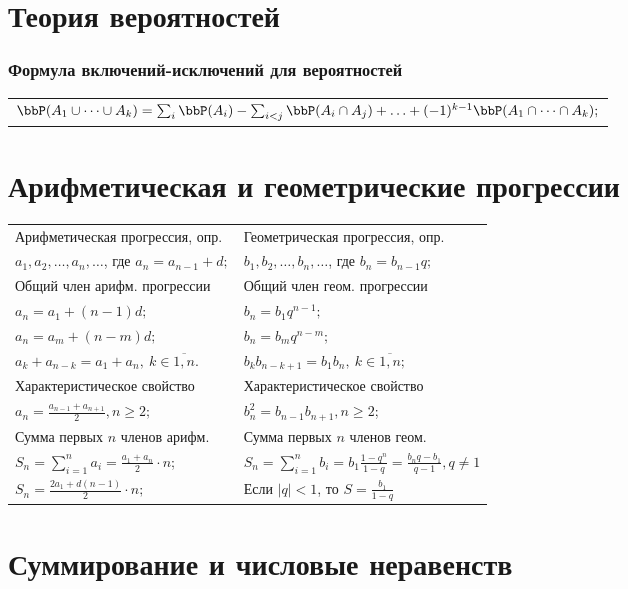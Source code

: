 \section{Теория вероятностей}

\subsubsection{Формула включений-исключений для вероятностей}

\begin{longtable}[l]{l}
	$\bbP(A_1\cup\dots\cup A_k)= \sum_{i} \bbP(A_i) - \sum_{i<j} \bbP(A_i\cap A_j)+\ldots + (-1)^{k-1}\bbP(A_1\cap\dots\cap A_k);$
\end{longtable}

\section{Арифметическая и геометрические прогрессии}
\begin{longtable}[l]{l l}
{\subsubfont Арифметическая прогрессия, опр.}
&
{\subsubfont Геометрическая прогрессия, опр.}
\\
{$a_1,a_2,\ldots,a_n,\dots$, где $a_{n}=a_{n-1}+d;$}
&
{$b_1,b_2,\ldots,b_n,\dots$, где $b_n=b_{n-1} q;$}
\\
{\subsubfont Общий член арифм. прогрессии}
&
{\subsubfont Общий член геом. прогрессии}
\\
$a_n=a_1+(n-1)d;$ & $b_n=b_1 q^{n-1};$
\\
$a_n=a_m+(n-m)d;$ & $b_n=b_m q^{n-m};$
\\
$a_k+a_{n-k}=a_1+a_n,\ k\in\overline{1,n}.$ & $b_kb_{n-k+1}=b_1b_n,\ k\in\overline{1,n};$
\\
{\subsubfont Характеристическое свойство}
&
{\subsubfont Характеристическое свойство}
\\
$a_n=\frac{a_{n-1}+a_{n+1}}{2}, n\geq 2;$ &
$b^2_n=b_{n-1}b_{n+1}, n\geq2$;
\\
{\subsubfont Сумма первых $n$ членов арифм.}
&
{\subsubfont Сумма первых $n$ членов геом.}
\\
$S_n=\sum_{i=1}^{n}a_i=\frac{a_1+a_n}{2}\cdot n$; & 
$S_n=\sum_{i=1}^{n}b_i=b_1\frac{1-q^n}{1-q}=\frac{b_n q-b_1}{q-1}, q\ne 1$
\\
$S_n=\frac{2a_1+d(n-1)}{2}\cdot n;$ & Если $|q|<1$, то $S=\frac{b_1}{1-q}$
\\
\end{longtable}

\section{Суммирование и числовые неравенств}
